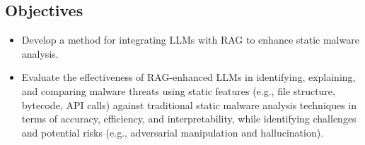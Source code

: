 \subsection{Objectives}
\begin{itemize}
	\item Develop a method for integrating LLMs with RAG to enhance static malware analysis.
	\item Evaluate the effectiveness of RAG-enhanced LLMs in identifying, explaining, and comparing malware
	      threats using static features (e.g., file structure, bytecode, API calls) against traditional
	      static malware analysis techniques in terms of accuracy, efficiency, and interpretability, while
	      identifying challenges and potential risks (e.g., adversarial manipulation and hallucination).
\end{itemize}



